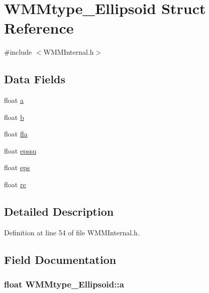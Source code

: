 \hypertarget{struct_w_m_mtype___ellipsoid}{\section{W\-M\-Mtype\-\_\-\-Ellipsoid Struct Reference}
\label{struct_w_m_mtype___ellipsoid}
}


{\ttfamily \#include $<$W\-M\-M\-Internal.\-h$>$}

\subsection*{Data Fields}
\begin{DoxyCompactItemize}
\item 
float \hyperlink{struct_w_m_mtype___ellipsoid_a9bcd028638f788a140352852646f5bf8}{a}
\item 
float \hyperlink{struct_w_m_mtype___ellipsoid_a6fa136040ff9c95d8681b3ed1522961a}{b}
\item 
float \hyperlink{struct_w_m_mtype___ellipsoid_a4bfc3186db2254aa1de93bfd694b420b}{fla}
\item 
float \hyperlink{struct_w_m_mtype___ellipsoid_a15d66d7d6873c33670330e639d548626}{epssq}
\item 
float \hyperlink{struct_w_m_mtype___ellipsoid_ab0125e1a063bfd086922e84040946912}{eps}
\item 
float \hyperlink{struct_w_m_mtype___ellipsoid_aca51be6e99eef3c6a7a7f16c292e60c5}{re}
\end{DoxyCompactItemize}


\subsection{Detailed Description}


Definition at line 54 of file W\-M\-M\-Internal.\-h.



\subsection{Field Documentation}
\hypertarget{struct_w_m_mtype___ellipsoid_a9bcd028638f788a140352852646f5bf8}{
\subsubsection[{a}]{\setlength{\rightskip}{0pt plus 5cm}float W\-M\-Mtype\-\_\-\-Ellipsoid\-::a}}\label{struct_w_m_mtype___ellipsoid_a9bcd028638f788a140352852646f5bf8}



